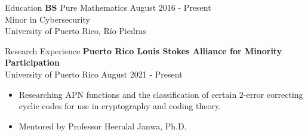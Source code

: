 \documentclass{resume} %
\begin{document}

\begin{rSection}{Education}
    \textbf{BS} \hspace*{10mm} Pure Mathematics \hfill{August 2016 - Present} \\
    \hspace*{17mm} Minor in Cybersecurity \\
     \hspace*{17mm} University of Puerto Rico, R\'io Piedras
\end{rSection}



\begin{rSection}{Research Experience}
    \textbf{Puerto Rico Louis Stokes Alliance for Minority Participation} \\
    University of Puerto Rico \hfill{August 2021 - Present}
    \begin{itemize}
        \item Researching APN functions and the classification of certain
            $2$-error correcting cyclic codes for use in cryptography and coding
            theory.

        \item Mentored by Professor Heeralal Janwa, Ph.D.
    \end{itemize}
\end{rSection}
\end{document}
